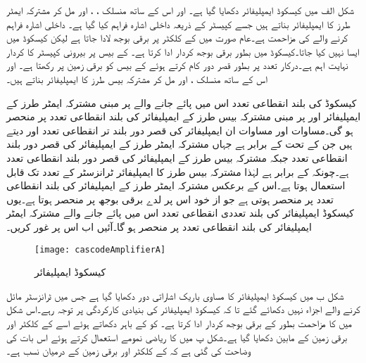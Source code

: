 شکل  الف میں کیسکوڈ ایمپلیفائر دکھایا گیا ہے۔ اور اس کے ساتھ منسلک ، ،  اور    مل کر مشترکہ ایمٹر        طرز کا ایمپلیفائر بناتے ہیں جسے کپیسٹر  کے ذریعہ داخلی اشارہ  فراہم کیا گیا ہے۔ داخلی اشارہ فراہم کرنے والے کی مزاحمت ہے۔عام صورت میں  کے کلکٹر  پر برقی بوجھ  لادا جاتا ہے لیکن کیسکوڈ میں ایسا نہیں کیا جاتا۔کیسکوڈ میں  بطور برقی بوجھ کردار ادا کرتا ہے۔  کے بیس  پر بیرونی کپیسٹر  کا کردار نہایت اہم ہے۔درکار تعدد پر   بطور قصر دور کام کرتے ہوئے  کے بیس  کو برقی زمین پر رکھتا ہے۔ اور اس کے ساتھ منسلک ،  اور  مل کر مشترکہ بیس  طرز کا ایمپلیفائر بناتے ہیں۔

کیسکوڈ کی بلند انقطاعی تعدد اس میں پائے جانے والے   پر مبنی مشترکہ ایمٹر طرز کے ایمپلیفائر اور  پر مبنی مشترکہ بیس  طرز کے ایمپلیفائر  کی بلند انقطاعی تعدد پر منحصر ہو گی۔مساوات  اور مساوات  ان ایمپلیفائر کی قصر دور بلند تر انقطاعی تعدد  اور  دیتے ہیں جن کے تحت  کے برابر ہے جہاں  مشترکہ ایمٹر  طرز کے ایمپلیفائر کی قصر دور بلند انقطاعی تعدد جبکہ  مشترکہ بیس  طرز کے ایمپلیفائر کی قصر دور بلند انقطاعی تعدد ہے۔چونکہ  کے برابر ہے لہٰذا مشترکہ بیس  طرز کا ایمپلیفائر ٹرانزسٹر کے  تعدد تک قابل استعمال ہوتا ہے۔اس کے برعکس مشترکہ ایمٹر طرز کے ایمپلیفائر کی بلند انقطاعی تعدد  پر منحصر ہوتی ہے جو از خود اس پر لدے برقی بوجھ  پر منحصر ہوتا ہے۔یوں کیسکوڈ ایمپلیفائر کی بلند تعددی انقطاعی تعدد اس میں پائے جانے والے مشترکہ ایمٹر ایمپلیفائر کی بلند انقطاعی تعدد پر منحصر ہو گا۔آئیں اب اس پر غور کریں۔
\begin{figure}
\centering
\texttt{[image: cascodeAmplifierA]}
\caption{کیسکوڈ ایمپلیفائر}
\label{شکل_تعددی_ردعمل_کیسکوڈ_ایمپلیفائر}
\end{figure}

شکل  ب میں کیسکوڈ ایمپلیفائر کا مساوی باریک اشاراتی دور دکھایا گیا ہے جس میں ٹرانزسٹر مائل کرنے والے اجزاء  نہیں دکھائے گئے تا کہ کیسکوڈ ایمپلیفائر کی بنیادی کارکردگی پر توجہ رہے۔اس شکل میں  کا مزاحمت  بطور  کے برقی بوجھ  کردار ادا کرتا ہے۔ کو  کے باہر دکھاتے ہوئے اسے  کے کلکٹر  اور برقی زمین کے مابین دکھایا گیا ہے۔شکل  پ میں  کا  ریاضی نمومے استعمال کرتے ہوئے اس بات کی وضاحت کی گئی ہے کہ  کے کلکٹر  اور برقی زمین کے درمیان  نسب ہے۔

